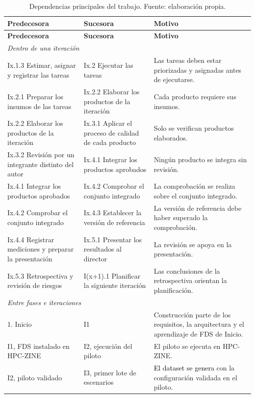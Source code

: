 \begin{longtable}{|p{}|p{}|p{}|}
\caption{Dependencias principales del trabajo. Fuente: elaboración propia.}\label{tab:wbs-dependencias}\\
\hline
\textbf{Predecesora} & \textbf{Sucesora} & \textbf{Motivo}\\\hline
\endfirsthead
\hline
\textbf{Predecesora} & \textbf{Sucesora} & \textbf{Motivo}\\\hline
\endhead
\multicolumn{3}{|l|}{\textit{Dentro de una iteración}}\\\hline
Ix.1.3 Estimar, asignar y registrar las tareas & Ix.2 Ejecutar las tareas & Las tareas deben estar priorizadas y asignadas antes de ejecutarse.\\\hline
Ix.2.1 Preparar los insumos de las tareas & Ix.2.2 Elaborar los productos de la iteración & Cada producto requiere sus insumos.\\\hline
Ix.2.2 Elaborar los productos de la iteración & Ix.3.1 Aplicar el proceso de calidad de cada producto & Solo se verifican productos elaborados.\\\hline
Ix.3.2 Revisión por un integrante distinto del autor & Ix.4.1 Integrar los productos aprobados & Ningún producto se integra sin revisión.\\\hline
Ix.4.1 Integrar los productos aprobados & Ix.4.2 Comprobar el conjunto integrado & La comprobación se realiza sobre el conjunto integrado.\\\hline
Ix.4.2 Comprobar el conjunto integrado & Ix.4.3 Establecer la versión de referencia & La versión de referencia debe haber superado la comprobación.\\\hline
Ix.4.4 Registrar mediciones y preparar la presentación & Ix.5.1 Presentar los resultados al director & La revisión se apoya en la presentación.\\\hline
Ix.5.3 Retrospectiva y revisión de riesgos & I(x+1).1 Planificar la siguiente iteración & Las conclusiones de la retrospectiva orientan la planificación.\\\hline
\multicolumn{3}{|l|}{\textit{Entre fases e iteraciones}}\\\hline
1. Inicio & I1 & Construcción parte de los requisitos, la arquitectura y el aprendizaje de FDS de Inicio.\\\hline
I1, FDS instalado en HPC-ZINE & I2, ejecución del piloto & El piloto se ejecuta en HPC-ZINE.\\\hline
I2, piloto validado & I3, primer lote de escenarios & \textcolor{black}{El dataset se genera} con la configuración validada en el piloto.\\\hline

\end{longtable}
